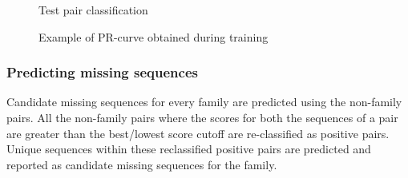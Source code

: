 \documentclass{article}
\begin{document}
			\begin{figure}
				\caption{Test pair classification}
				\label{fig:train_classify2}
			\end{figure}
			
			\begin{figure}[h!]
				\caption{Example of PR-curve obtained during training}
				\label{fig:test_PR-curve}
			\end{figure}
		
			\subsubsection{Predicting missing sequences}
			Candidate missing sequences for every family are predicted using the non-family pairs. All the non-family pairs where the scores for both the sequences of a pair are greater than the best/lowest score cutoff are re-classified as positive pairs. Unique sequences within these reclassified positive pairs are predicted and reported as candidate missing sequences for the family.
			
\end{document}
